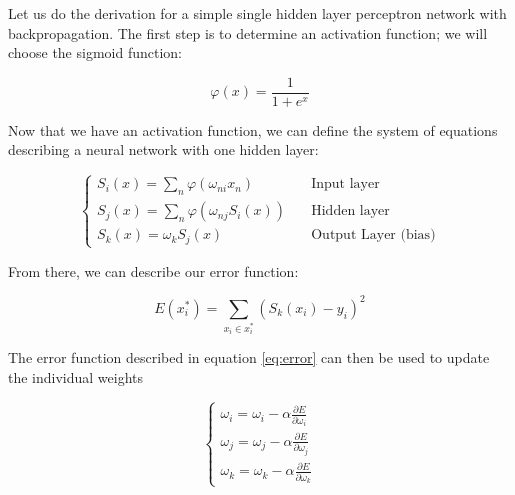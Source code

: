 \documentclass{comjnl}
\numberwithin{equation}{subsection}
\begin{document}
            Let us do the derivation for a simple single hidden layer perceptron network with
            backpropagation. The first step is to determine an activation function; we will choose
            the sigmoid function:

            \begin{equation}\label{eq:act}
                \varphi(x)=\frac{1}{1+e^x}
            \end{equation}

            \noindent Now that we have an activation function, we can define the system of equations
            describing a neural network with one hidden layer:

            \begin{equation}\label{eq:basicnnet}
                \begin{cases}
                    S_i(x)=\sum_n \varphi(\omega_{ni}x_n) & \quad \text{Input layer} \\
                    S_j(x)=\sum_n \varphi(\omega_{nj}S_i(x)) & \quad \text{Hidden layer} \\
                    S_k(x)=\omega_kS_j(x) & \quad \text{Output Layer (bias)}
                \end{cases}
            \end{equation}

            \noindent From there, we can describe our error function:

            \begin{equation}\label{eq:error}
                E(x_i^*) = \sum_{x_i \in x_i^*} (S_k(x_i)-y_i)^2
            \end{equation}

            \noindent The error function described in equation \eqref{eq:error} can then be used to
            update the individual weights

            \begin{equation}\label{eq:update}
                \begin{cases}
                    \omega_i = \omega_i - \alpha\frac{\partial E}{\partial \omega_i} \\
                    \omega_j = \omega_j - \alpha\frac{\partial E}{\partial \omega_j} \\
                    \omega_k = \omega_k - \alpha\frac{\partial E}{\partial \omega_k}
                \end{cases}
            \end{equation}
\end{document}
